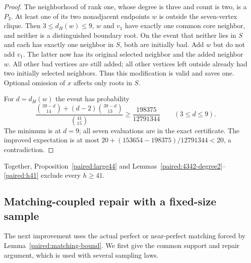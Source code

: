 \documentclass[11pt,a4paper]{article}
\theoremstyle{definition}\newtheorem{definition}[theorem]{Definition}
\theoremstyle{remark}\newtheorem{remark}[theorem]{Remark}
\begin{document}
\begin{proof}
The neighborhood of rank one, whose degree is three and count is
two, is a $P_3$. At least one of its two nonadjacent endpoints $w$
is outside the seven-vertex clique. Then $3\le d_H(w)\le9$,
$w$ and $v_1$ have exactly one common core neighbor, and neither
is a distinguished boundary root. On the event that neither lies
in $S$ and each has exactly one neighbor in $S$, both are initially
bad. Add $w$ but do not add $v_1$. The latter now has its original
selected neighbor and the added neighbor $w$. All other bad vertices
are still added; all other vertices left outside already had two
initially selected neighbors. Thus this modification is valid and
saves one. Optional omission of $x$ affects only roots in $S$.

For $d=d_H(w)$ the event has probability
\[
 \frac{\binom{39-d}{14}+(d-2)\binom{39-d}{13}}{\binom{41}{15}}
 \ge\frac{198375}{12791344}\qquad(3\le d\le9).
\]
The minimum is at $d=9$; all seven evaluations are in the exact
certificate. The improved expectation is at most
$20+(153654-198375)/12791344<20$, a contradiction.
\end{proof}

Together, Proposition~\ref{paired:large44} and
Lemmas~\ref{paired:4342-degree2}--\ref{paired:h41} exclude every $h\ge41$.

\subsection{Matching-coupled repair with a fixed-size sample}
\label{paired:uniform-pairs-section}

The next improvement uses the actual perfect or near-perfect matching
forced by Lemma~\ref{paired:matching-bound}. We first give the common
support and repair argument, which is used with several sampling laws.
\end{document}
